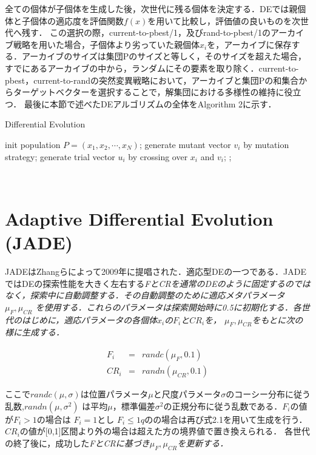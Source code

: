 \documentclass[a4paper,11pt,oneside,openany]{jsbook}
\begin{document}
全ての個体が子個体を生成した後，次世代に残る個体を決定する．DEでは親個体と子個体の適応度を評価関数$f(x)$を用いて比較し，評価値の良いものを次世代へ残す．
この選択の際，current-to-pbest/1，及びrand-to-pbest/1のアーカイブ戦略を用いた場合，子個体より劣っていた親個体$x_{i}$を，アーカイブに保存する．アーカイブのサイズは集団Pのサイズと等しく，そのサイズを超えた場合，すでにあるアーカイブの中から，ランダムにその要素を取り除く．current-to-pbest，current-to-randの突然変異戦略において，アーカイブと集団Pの和集合からターゲットベクターを選択することで，解集団における多様性の維持に役立つ．
最後に本節で述べたDEアルゴリズムの全体をAlgorithm 2に示す．
\begin{algorithm}                      
\caption{Differential Evolution}         
\label{alg:pbnf}                          
\begin{algorithmic}  
\STATE init population ${P} = (x_1, x_2, \cdots, x_N)$;
        \STATE generate mutant vector {$v_i$} by mutation strategy;
        \STATE generate trial vector {$u_i$} by crossing over {$x_i$} and {$v_i$}; 
    \ENDFOR
            ;
        \ENDIF
    \ENDFOR
\ENDWHILE
\end{algorithmic}
\end{algorithm}　　　　　　　　　　　　　　　　　　　　　


\section{Adaptive Differential Evolution (JADE)}
JADEはZhangらによって2009年に提唱された．適応型DEの一つである．JADEではDEの探索性能を大きく左右する\sl{F}と\sl{CR}を通常のDEのように固定するのではなく，探索中に自動調整する．その自動調整のために適応メタパラメータ$\mu _F,\mu _{CR}$ を使用する．これらのパラメータは探索開始時に0.5に初期化する．各世代のはじめに，適応パラメータの各個体$x_i$の$F_i$と$CR_i$を，
$\mu _F,\mu _{CR}$をもとに次の様に生成する．

\begin{eqnarray}
  F_i & = & randc(\mu _F, 0.1) \\
  CR_i & = & randn(\mu _{CR}, 0.1)
\end{eqnarray}

ここで$randc(\mu,　\sigma)$は位置パラメータ$\mu$と尺度パラメータ$\sigma$のコーシー分布に従う乱数,$randn(\mu,\sigma^2)$ は平均$\mu$，標準偏差$\sigma^2$の正規分布に従う乱数である．$F_i$の値が$F_i>1$の場合は
$F_i=1$とし $F_i\le1qの$の場合は再び式2.1を用いて生成を行う．$CR_i$の値が[0,1]区間より外の場合は超えた方の境界値で置き換えられる．
各世代の終了後に，成功した\sl{F}と\sl{CR}に基づき$\mu _F, \mu _{CR}$を更新する．
\end{document}
